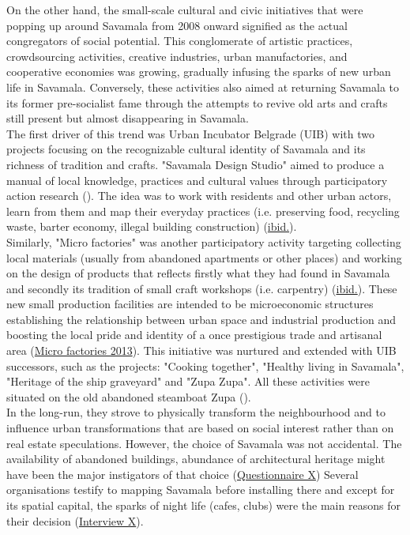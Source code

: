 \documentclass[11pt]{report}
\begin{document}
{{{{%
On the other hand, the small-scale cultural and civic initiatives that were popping up around Savamala from 2008 onward signified as the actual congregators of social potential. This conglomerate of artistic practices, crowdsourcing activities, creative industries, urban manufactories, and cooperative economies was growing, gradually infusing the sparks of new urban life in Savamala. Conversely, these activities also aimed at returning Savamala to its former pre-socialist fame through the attempts to revive old arts and crafts still present but almost disappearing in Savamala.
\\

The first driver of this trend was Urban Incubator Belgrade (UIB) with two projects focusing on the recognizable cultural identity of Savamala and its richness of tradition and crafts. "Savamala Design Studio" aimed to produce a manual of local knowledge, practices and cultural values through participatory action research (\href{Cvetinovic}{\citealt{cvetinovic_engine_2013}}).
The idea was to work with residents and other urban actors, learn from them and map their everyday practices (i.e. preserving food, recycling waste, barter economy, illegal building construction) (\href{Cvetinovic}{ibid.}).
\\

Similarly, "Micro factories" was another participatory activity targeting collecting local materials (usually from abandoned apartments or other places) and working on the design of products that reflects firstly what they had found in Savamala and secondly its tradition of small craft workshops (i.e. carpentry) (\href{Cvetinovic}{ibid.}). 
These new small production facilities are intended to be microeconomic structures establishing the relationship between urban space and industrial production and boosting the local pride and identity of a once prestigious trade and artisanal area (\href{ref}{Micro factories 2013}).
This initiative was nurtured and extended with UIB successors, such as the projects: "Cooking together", "Healthy living in Savamala", "Heritage of the ship graveyard" and "Zupa Zupa".
All these activities were situated on the old abandoned steamboat Zupa (\href{ref}{\citealt{belic_parobrod_2014}}).
\\


In the long-run, they strove to physically transform the neighbourhood and to influence urban transformations that are based on social interest rather than on real estate speculations. However, the choice of Savamala was not accidental. The availability of abandoned buildings, abundance of architectural heritage might have been the major instigators of that choice 
(\href{Questionnaire Experts Savamala}{Questionnaire X})
Several organisations testify to mapping Savamala before installing there and except for its spatial capital, the sparks of night life (cafes, clubs) were the main reasons for their decision 
(\href{InterviewX}{Interview X}).
\\

}}}}
\end{document}
